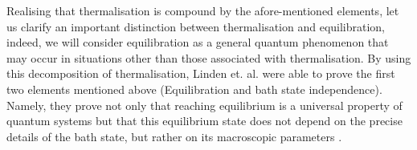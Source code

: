\indent Realising that thermalisation is compound by the afore-mentioned elements, let us clarify an important distinction between thermalisation and equilibration, indeed, we will consider equilibration as a general quantum phenomenon that may occur in situations other than those associated with thermalisation. By using this decomposition of thermalisation, Linden et. al. were able to prove the first two elements mentioned above (Equilibration and bath state independence). Namely, they prove not only that reaching equilibrium is a universal property of quantum systems but that this equilibrium state does not depend on the precise details of the bath state, but rather on its macroscopic parameters \cite{linden_quantum_2009}.\\

